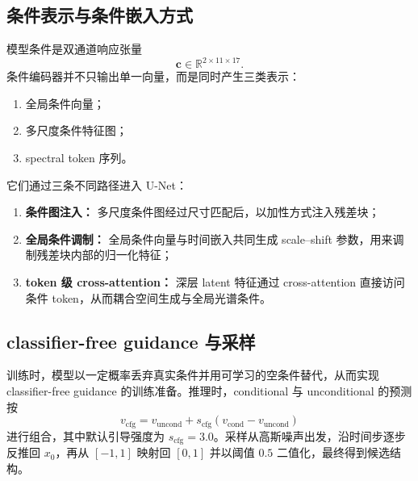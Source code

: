 \documentclass[10pt,a4paper]{article}
\begin{document}
\subsection{条件表示与条件嵌入方式}

模型条件是双通道响应张量
\begin{equation}
\mathbf{c}\in\mathbb{R}^{2\times11\times17}.
\end{equation}
条件编码器并不只输出单一向量，而是同时产生三类表示：
\begin{enumerate}[leftmargin=1.5em]
\item 全局条件向量；
\item 多尺度条件特征图；
\item spectral token 序列。
\end{enumerate}
它们通过三条不同路径进入 U-Net：
\begin{enumerate}[leftmargin=1.5em]
\item \textbf{条件图注入：} 多尺度条件图经过尺寸匹配后，以加性方式注入残差块；
\item \textbf{全局条件调制：} 全局条件向量与时间嵌入共同生成 scale--shift 参数，用来调制残差块内部的归一化特征；
\item \textbf{token 级 cross-attention：} 深层 latent 特征通过 cross-attention 直接访问条件 token，从而耦合空间生成与全局光谱条件。
\end{enumerate}

\subsection{classifier-free guidance 与采样}

训练时，模型以一定概率丢弃真实条件并用可学习的空条件替代，从而实现 classifier-free guidance 的训练准备。推理时，conditional 与 unconditional 的预测按
\begin{equation}
v_{\mathrm{cfg}}=v_{\mathrm{uncond}}+s_{\mathrm{cfg}}\left(v_{\mathrm{cond}}-v_{\mathrm{uncond}}\right)
\end{equation}
进行组合，其中默认引导强度为 $s_{\mathrm{cfg}}=3.0$。采样从高斯噪声出发，沿时间步逐步反推回 $x_0$，再从 $[-1,1]$ 映射回 $[0,1]$ 并以阈值 $0.5$ 二值化，最终得到候选结构。
\end{document}
